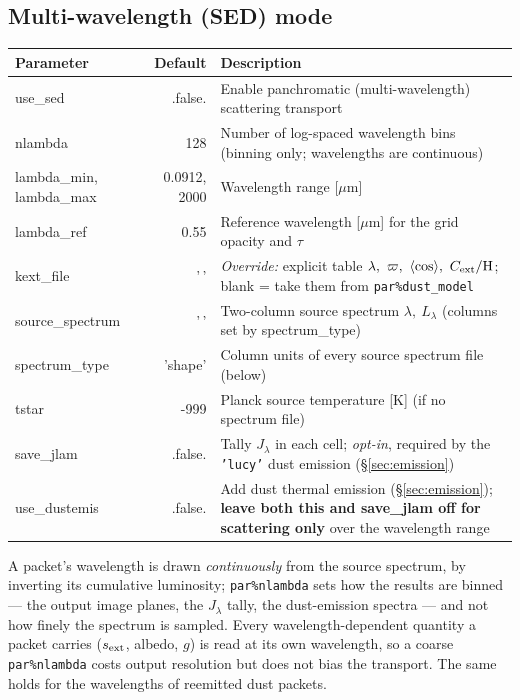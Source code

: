 \documentclass[english,a4paper]{kiseon_memo}
\newcommand{\pp}[1]{\texttt{par\%#1}}
\newcommand{\code}[1]{\texttt{#1}}
\begin{document}
\subsection{Multi-wavelength (SED) mode}\label{sec:sed}
\begin{longtable}{P D X}
\toprule
\textrm{Parameter} & \textrm{Default} & \textrm{Description}\\
\midrule \endhead
use\_sed           & .false. & Enable panchromatic (multi-wavelength) scattering transport\\
nlambda            & 128     & Number of log-spaced wavelength bins (binning only; wavelengths are continuous)\\
lambda\_min, lambda\_max & 0.0912, 2000 & Wavelength range [$\mu$m]\\
lambda\_ref        & 0.55    & Reference wavelength [$\mu$m] for the grid opacity and $\tau$\\
kext\_file         & '\,'    & \emph{Override:} explicit table $\lambda,\ \varpi,\ \langle\cos\rangle,\ C_{\rm ext}/{\rm H}$; blank = take them from \pp{dust\_model}\\
source\_spectrum   & '\,'    & Two-column source spectrum $\lambda,\ L_\lambda$ (columns set by spectrum\_type)\\
spectrum\_type     & 'shape' & Column units of every source spectrum file (below)\\
tstar              & -999    & Planck source temperature [K] (if no spectrum file)\\
save\_jlam         & .false. & Tally $J_\lambda$ in each cell; \emph{opt-in}, required by the \code{'lucy'} dust emission (\S\ref{sec:emission})\\
use\_dustemis      & .false. & Add dust thermal emission (\S\ref{sec:emission}); \textbf{leave both this and save\_jlam off for scattering only} over the wavelength range\\
\bottomrule
\end{longtable}

A packet's wavelength is drawn \emph{continuously} from the source spectrum, by
inverting its cumulative luminosity; \pp{nlambda} sets how the results are
binned --- the output image planes, the $J_\lambda$ tally, the dust-emission
spectra --- and not how finely the spectrum is sampled.  Every wavelength-dependent
quantity a packet carries ($s_{\rm ext}$, albedo, $g$) is read at its own
wavelength, so a coarse \pp{nlambda} costs output resolution but does not bias
the transport.  The same holds for the wavelengths of reemitted dust packets.
\end{document}
